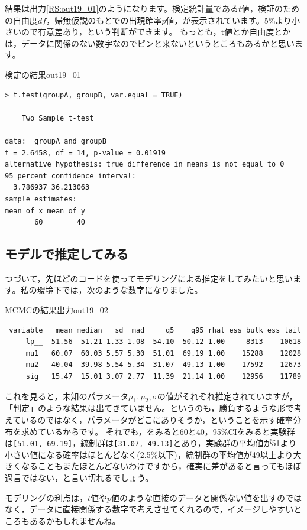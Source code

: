 \documentclass{ltjsbook}
\begin{document}
結果は出力\ref{RS:out19_01}のようになります。検定統計量である$t$値，検証のための自由度$df$，帰無仮説のもとでの出現確率$p$値，が表示されています。5\%より小さいので有意差あり，という判断ができます。
もっとも，t値とか自由度とかは，データに関係のない数字なのでピンと来ないというところもあるかと思います。
\begin{Rscreen}{検定の結果}{out19_01}
\begin{verbatim}
> t.test(groupA, groupB, var.equal = TRUE)

	Two Sample t-test

data:  groupA and groupB
t = 2.6458, df = 14, p-value = 0.01919
alternative hypothesis: true difference in means is not equal to 0
95 percent confidence interval:
  3.786937 36.213063
sample estimates:
mean of x mean of y 
       60        40 
\end{verbatim}
\end{Rscreen}

\subsection{モデルで推定してみる}
つづいて，先ほどのコードを使ってモデリングによる推定をしてみたいと思います。私の環境下では，次のような数字になりました。

\begin{SCcmd}{MCMCの結果出力}{out19_02}
\begin{verbatim}
 variable   mean median   sd  mad     q5    q95 rhat ess_bulk ess_tail
     lp__ -51.56 -51.21 1.33 1.08 -54.10 -50.12 1.00     8313    10618
     mu1   60.07  60.03 5.57 5.30  51.01  69.19 1.00    15288    12028
     mu2   40.04  39.98 5.54 5.34  31.07  49.13 1.00    17592    12673
     sig   15.47  15.01 3.07 2.77  11.39  21.14 1.00    12956    11789    
\end{verbatim}
\end{SCcmd}
これを見ると，未知のパラメータ$\mu_1, \mu_2, \sigma$の値がそれぞれ推定されていますが，「判定」のような結果は出てきていません。というのも，勝負するような形で考えているのではなく，パラメータがどこにありそうか，ということを示す確率分布を求めているからです。
それでも，をみると60と40，95\%CIをみると実験群は\verb|[51.01, 69.19]|，統制群は\verb|[31.07, 49.13]|とあり，実験群の平均値が51より小さい値になる確率はほとんどなく(2.5\%以下)，統制群の平均値が49以上より大きくなることもまたほとんどないわけですから，確実に差があると言ってもほぼ過言ではない，と言い切れるでしょう。

モデリングの利点は，$t$値や$p$値のような直接のデータと関係ない値を出すのではなく，データに直接関係する数字で考えさせてくれるので，イメージしやすいところもあるかもしれませんね。
\end{document}
